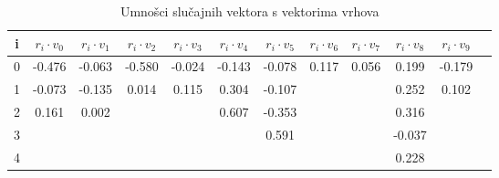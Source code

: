 \documentclass[diplomskirad]{fer}
\begin{document}
\begin{table}[h]
  \caption{Umnošci slučajnih vektora s vektorima vrhova}
  \label{skalar}
  \begin{tabular}{|c|c|c|c|c|c|c|c|c|c|c|c|}
    \hline
    i & $r_i \cdot v_0 $ & $r_i \cdot v_1 $ & $r_i \cdot v_2 $ & $r_i \cdot v_3 $ & $r_i \cdot v_4 $ & $r_i \cdot v_5 $ & $r_i \cdot v_6 $ & $r_i \cdot v_7 $ & $r_i \cdot v_8 $ & $r_i \cdot v_9 $ \\
    \hline
    \hline
    0 & -0.476 & -0.063 & -0.580 & -0.024 & -0.143 & -0.078 & 0.117 & 0.056 & 0.199 & -0.179 \\
    \hline
    1 & -0.073 & -0.135 & 0.014 & 0.115 & 0.304 & -0.107&& & 0.252 & 0.102 \\
    \hline
    2 & 0.161 & 0.002 & & & 0.607 & -0.353 & & & 0.316 & \\
    \hline
    3 & & & & & & 0.591 & & & -0.037 & \\
    \hline
    4 & & & & & & & & & 0.228 & \\
    \hline
  \end{tabular}
\end{table}
\end{document}
